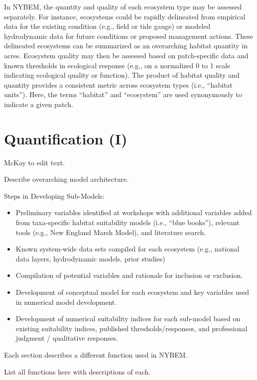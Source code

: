 \documentclass[
]{book}
\begin{document}
In NYBEM, the quantity and quality of each ecosystem type may be assessed separately. For instance, ecosystems could be rapidly delineated from empirical data for the existing condition (e.g., field or tide gauge) or modeled hydrodynamic data for future conditions or proposed management actions. These delineated ecosystems can be summarized as an overarching habitat quantity in acres. Ecosystem quality may then be assessed based on patch-specific data and known thresholds in ecological response (e.g., on a normalized 0 to 1 scale indicating ecological quality or function). The product of habitat quality and quantity provides a consistent metric across ecosystem types (i.e., ``habitat units''). Here, the terms ``habitat'' and ``ecosystem'' are used synonymously to indicate a given patch.

\hypertarget{quantification-i}{%
\chapter{Quantification (I)}\label{quantification-i}}

{McKay to edit text.}

Describe overarching model architecture.

Steps in Developing Sub-Models:

\begin{itemize}
\item
  Preliminary variables identified at workshops with additional variables added from taxa-specific habitat suitability models (i.e., ``blue books''), relevant tools (e.g., New England Marsh Model), and literature search.
\item
  Known system-wide data sets compiled for each ecosystem (e.g., national data layers, hydrodynamic models, prior studies)
\item
  Compilation of potential variables and rationale for inclusion or exclusion.
\item
  Development of conceptual model for each ecosystem and key variables used in numerical model development.
\item
  Development of numerical suitability indices for each sub-model based on existing suitability indices, published thresholds/responses, and professional judgment / qualitative responses.
\end{itemize}

Each section describes a different function used in NYBEM.

List all functions here with descriptions of each.
\end{document}
